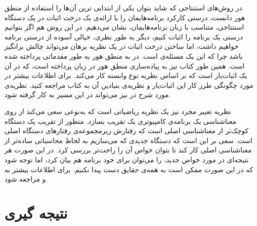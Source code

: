 \documentclass[12pt]{report}
\begin{document}
در روش‌های استنتاجی که شاید بتوان یکی از ابتدایی ترین آن‌ها را استفاده از منطق هور\cite{hoare} دانست، درستی کارکرد برنامه‌هایمان را با ارائه‌ی یک درخت اثبات در یک دستگاه استنتاجی، متناسب با زبان برنامه‌هایمان، نشان می‌‌دهیم. در این روش هم اگر بتوانیم درستی یک برنامه را اثبات کنیم، دیگر به‌ طور نظری، خیالی آسوده از درستی برنامه خواهیم داشت، اما ساختن درخت اثبات در یک نظریه برهان می‌تواند چالش بر‌انگیز باشد چرا که این یک مسئله‌ی  است. در\cite{logicincs} به منطق هور به طور مقدماتی پرداخته شده است. همین ‌طور کتاب\cite{softwarefoundations} نیز به پیاده‌سازی منطق هور در زبان  پرداخته است، که در آن  یک اثبات‌یار است که بر اساس نظریه نوع وابسته کار می‌کند. برای اطلاعات بیشتر در مورد چگونگی طرز کار این اثبات‌یار و نظریه‌ی بنیادین آن به کتاب\cite{chlipala} مراجعه‌ کنید. نظریه‌ی مورد شرح در\cite{dynamic} نیز می‌تواند در این مسیر به کار گرفته شود.

نظریه تعبیر مجرد\cite{cousot1} نیز یک نظریه ریاضیاتی است که به‌نوعی سعی می‌کند از روی معناشناسی یک برنامه‌ی کامپیوتری\cite{winskel} یک تقریب بسازد. منظور از تقریب یک دستگاه کوچک‌تر از معناشناسی اصلی است که رفتارش زیرمجموعه‌ی رفتارهای دستگاه اصلی است. سعی بر این است که دستگاه جدیدی که می‌سازیم به لحاظ محاسباتی ساده‌تر از معناشناسی اصلی کار کند تا بتوان خواص آن را راحت‌تر بررسی کرد. در این صورت هر نتیجه‌ای در مورد خواص جدید، را می‌توان برای خود برنامه هم بیان کرد، اما توجه شود که در این صورت ممکن است به همه‌ی حقایق دست پیدا نکنیم. برای اطلاعات بیشتر به \cite{cousotbook} و \cite{statica} مراجعه شود.



\tableofcontents







\chapter{نتیجه گیری}

\printglossary


\newpage
\begin{latin}
	
	
\end{latin}
\end{document}

